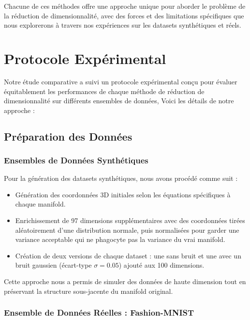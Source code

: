 \documentclass[unnumsec,webpdf,modern,large]{projet_manifold}%
\theoremstyle{thmstyleone}%
\theoremstyle{thmstyletwo}%
\theoremstyle{thmstylethree}%
\begin{document}
Chacune de ces méthodes offre une approche unique pour aborder le problème de la réduction de dimensionnalité, avec des forces et des limitations spécifiques que nous explorerons à travers nos expériences sur les datasets synthétiques et réels.


\section{Protocole Expérimental}

Notre étude comparative a suivi un protocole expérimental  conçu pour évaluer équitablement les performances de chaque méthode de réduction de dimensionnalité sur différents ensembles de données, Voici les détails de notre approche :

\subsection{Préparation des Données}

\subsubsection{Ensembles de Données Synthétiques}
Pour la génération des datasets synthétiques, nous avons procédé comme suit :

\begin{itemize}
    \item Génération des coordonnées 3D initiales selon les équations spécifiques à chaque manifold.
    \item Enrichissement de 97 dimensions supplémentaires avec des coordonnées tirées aléatoirement d'une distribution normale, puis normalisées pour garder une variance acceptable qui ne phagocyte pas la variance du vrai manifold.
    \item Création de deux versions de chaque dataset : une sans bruit et une avec un bruit gaussien (écart-type $\sigma = 0.05$) ajouté aux 100 dimensions.
\end{itemize}

Cette approche nous a permis de simuler des données de haute dimension tout en préservant la structure sous-jacente du manifold original.

\subsubsection{Ensemble de Données Réelles : Fashion-MNIST}
\end{document}
